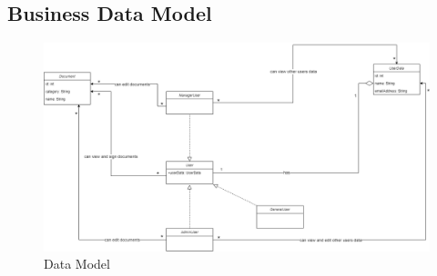 \documentclass[12pt]{article}
\begin{document}
\subsection{Business Data Model}
\begin{figure}[h]
  \includegraphics[width=1\textwidth]{4G06A-data-model.png}
  \caption{Data Model}
\end{figure}
\end{document}
